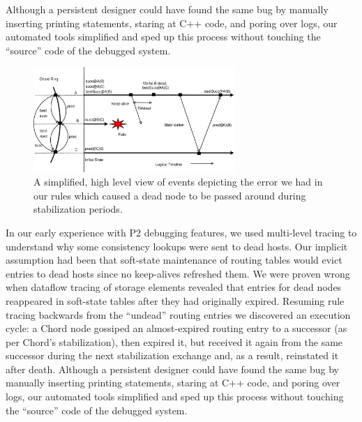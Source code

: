 \documentclass[10pt,twocolumn]{article}
\def\Sys{P2\xspace}
\newcommand{\note}[1]{}
\begin{document}
Although a persistent
designer could have found the same bug by manually inserting printing
statements, staring at C++ code, and poring over logs, our automated
tools simplified and sped up this process without touching the
``source'' code of the debugged system.



\begin{figure}
\centering
\includegraphics[width=3in]{debug2.eps}
\caption{A simplified, high level view of events depicting the error we had in our rules which 
caused a dead node to be passed around during stabilization periods.}
\label{fig:debug-high}
\end{figure}
\fi

\note{Atul to gussy this up somewhat to highlight this paragraph as a
  separate discussion, and to explain how rules would have helped
  detect this problem (had they existed at the time.)}


In our early experience with \Sys debugging features, we used
multi-level tracing to understand why some consistency lookups were
sent to dead hosts. Our implicit assumption had been that
soft-state maintenance of routing tables would evict entries to dead
hosts since no keep-alives refreshed them. We were proven wrong when
dataflow tracing of storage elements revealed that 
entries for dead nodes reappeared in soft-state tables after they had
originally expired. Resuming rule tracing backwards from the ``undead'' routing entries we
discovered an execution cycle: a Chord node gossiped an
almost-expired routing entry to a successor (as per Chord's
stabilization), then expired it, but received it again from the same
successor during the next stabilization exchange and, as a result,
reinstated it after death.  Although a persistent designer could have
found the same bug by manually inserting printing statements, staring at
C++ code, and poring over logs, our automated tools simplified and sped
up this process without touching the ``source'' code of the debugged
system. \note{P: Does this explanation make sense?  I removed the figure
  after rewriting the text.}
\fi
\end{document}
